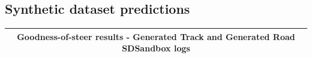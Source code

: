 \subsection{Synthetic dataset predictions}


\begin{table}[]
\begin{center}
\begin{tabular}{|l|l|l|l|l|l|}
\hline
\multicolumn{6}{|c|}{Goodness-of-steer results - Generated Track and Generated Road SDSandbox logs} \\ \hline




\end{tabular}
\end{center}
\end{table}
